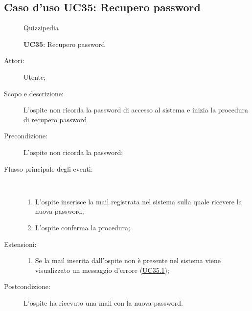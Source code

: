 \subsection{Caso d'uso UC35: Recupero password}
	\begin{figure}[H]
		\centering
		\begin{resizedtikzpicture}{\textwidth}
		\begin{umlsystem}[x=0, fill=lightgray!20]{Quizzipedia}
		\end{umlsystem}
		\end{resizedtikzpicture}
		\caption{\textbf{UC35}: Recupero password}
		\label{UC35}
	\end{figure}
\begin{description}
\item[Attori:] Utente;
\item[Scopo e descrizione:] L'ospite non ricorda la password di accesso al sistema e inizia la procedura di recupero password 
      \item[Precondizione:] L'ospite non ricorda la password;

        \item[Flusso principale degli eventi:] \ 
 \begin{enumerate}
          \item L'ospite inserisce la mail registrata nel sistema sulla quale ricevere la nuova password;
          \item L'ospite conferma la procedura;

      \end{enumerate}
    \item[Estensioni:]
      \begin{enumerate}
          \item Se la mail inserita dall'ospite non è presente nel sistema viene visualizzato un messaggio d'errore (\hyperlink{UC35.1}{UC35.1});

      \end{enumerate}
    \item[Postcondizione:] L'ospite ha ricevuto una mail con la nuova password.
  \end{description}
\hypertarget{UC35.1}{}
